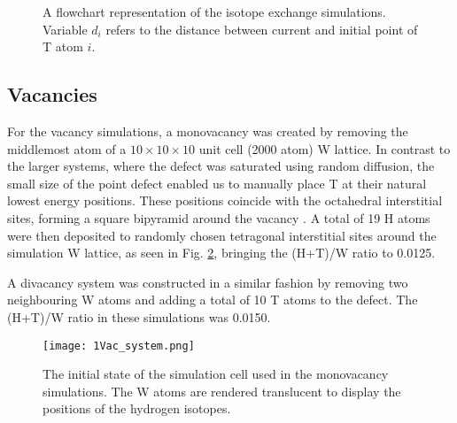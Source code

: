 \begin{figure}[!ht]
\begin{center}
\endgroup
\caption{A flowchart representation of the isotope exchange simulations. Variable $d_i$ refers to the distance between current and initial point of T atom $i$.} 
\label{Fig:isoExSimus}
\end{center}
\end{figure}


\subsection{Vacancies}
For the vacancy simulations, a monovacancy was created by removing the middlemost atom of a $10\times 10 \times 10$ unit cell (2000 atom) W lattice.  
In contrast to the larger systems, where the defect was saturated using random diffusion, the small size of the point defect enabled us to manually place T at their natural lowest energy positions.
These positions coincide with the octahedral interstitial sites, forming a square bipyramid around the vacancy \cite{heinolaTungstenDFT}.
A total of 19 H atoms were then deposited to randomly chosen tetragonal interstitial sites around the simulation W lattice, as seen in Fig. \ref{Fig:monovac_system}, bringing the (H+T)/W ratio to 0.0125. 

A divacancy system was constructed in a similar fashion by removing two neighbouring W atoms and adding a total of 10 T atoms to the defect.
The (H+T)/W ratio in these simulations was 0.0150.

\begin{figure}[!ht]
\center
\texttt{[image: 1Vac\_system.png]}
\caption{The initial state of the simulation cell used in the monovacancy simulations. 
The W atoms are rendered translucent to display the positions of the hydrogen isotopes.}
\label{Fig:monovac_system}
\end{figure}

